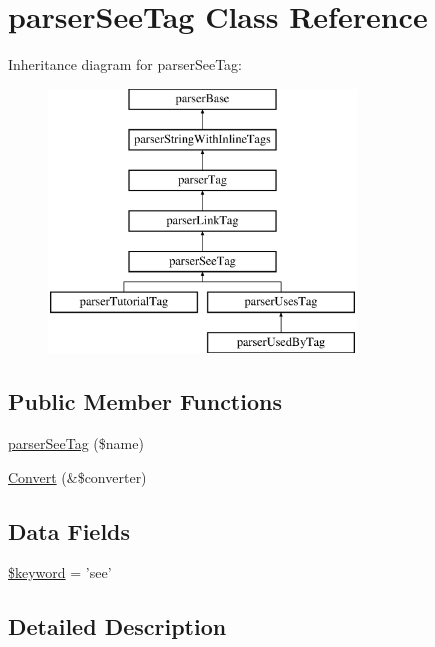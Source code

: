 \hypertarget{classparser_see_tag}{\section{parser\-See\-Tag \-Class \-Reference}
\label{classparser_see_tag}
}
\-Inheritance diagram for parser\-See\-Tag\-:\begin{figure}[H]
\begin{center}
\leavevmode
\includegraphics[height=7.000000cm]{classparser_see_tag}
\end{center}
\end{figure}
\subsection*{\-Public \-Member \-Functions}
\begin{DoxyCompactItemize}
\item 
\hyperlink{classparser_see_tag_ad37d85a8c45c0a8c18335101ec6c7bb8}{parser\-See\-Tag} (\$name)
\item 
\hyperlink{classparser_see_tag_a31e57fd66b58b300f8a489aa1b9431f6}{\-Convert} (\&\$converter)
\end{DoxyCompactItemize}
\subsection*{\-Data \-Fields}
\begin{DoxyCompactItemize}
\item 
\hyperlink{classparser_see_tag_a4a925d6b38bcf3957c713a7d3dc7da1f}{\$keyword} = 'see'
\end{DoxyCompactItemize}


\subsection{\-Detailed \-Description}


